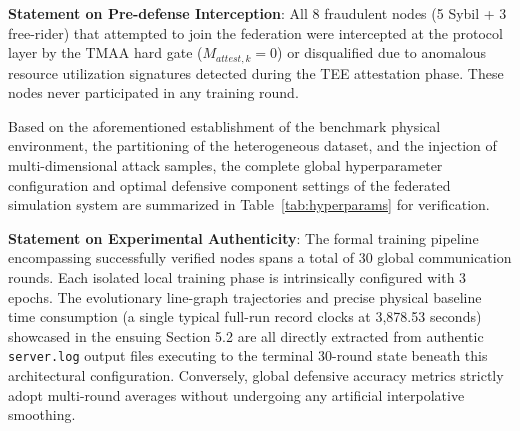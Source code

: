 \documentclass[runningheads]{llncs}
\begin{document}
\textbf{Statement on Pre-defense Interception}: All 8 fraudulent nodes (5 Sybil + 3 free-rider) that attempted to join the federation were intercepted at the protocol layer by the TMAA hard gate ($M_{attest,k} = 0$) or disqualified due to anomalous resource utilization signatures detected during the TEE attestation phase. These nodes never participated in any training round.

Based on the aforementioned establishment of the benchmark physical environment, the partitioning of the heterogeneous dataset, and the injection of multi-dimensional attack samples, the complete global hyperparameter configuration and optimal defensive component settings of the federated simulation system are summarized in Table~\ref{tab:hyperparams} for verification.

\begin{table}[htbp]
\centering
\caption{Global Hyperparameters and Defensive Component Optimal Setting Matrix for Physical Platform-based Federated Simulation}
\label{tab:hyperparams}
\end{table}

\textbf{Statement on Experimental Authenticity}: The formal training pipeline encompassing successfully verified nodes spans a total of 30 global communication rounds. Each isolated local training phase is intrinsically configured with 3 epochs. The evolutionary line-graph trajectories and precise physical baseline time consumption (a single typical full-run record clocks at 3,878.53 seconds) showcased in the ensuing Section 5.2 are all directly extracted from authentic \texttt{server.log} output files executing to the terminal 30-round state beneath this architectural configuration. Conversely, global defensive accuracy metrics strictly adopt multi-round averages without undergoing any artificial interpolative smoothing.
\end{document}
